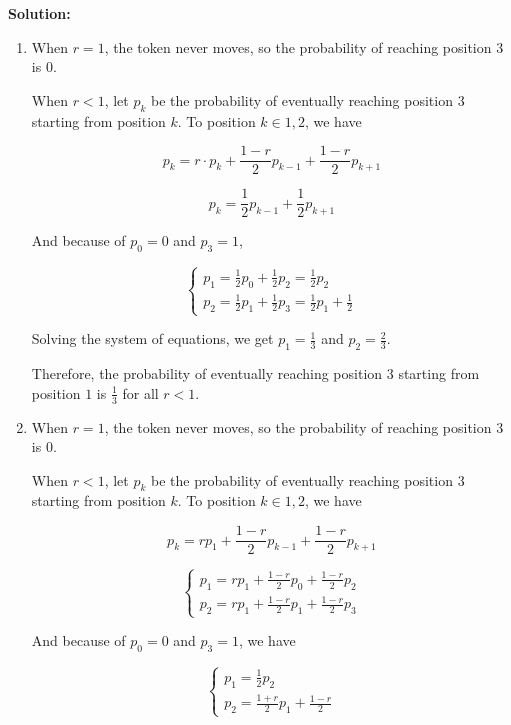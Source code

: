 \documentclass[11pt,a4paper]{article}
\begin{document}
\textbf{Solution:}

\begin{enumerate}
    \item[(a)]

    When $r=1$, the token never moves, so the probability of reaching position $3$ is $0$.

    When $r<1$, let $p_k$ be the probability of eventually reaching position $3$ starting from position $k$. To position $k \in {1, 2}$, we have

    $$
    p_k = r \cdot p_k + \frac{1-r}{2} p_{k-1} + \frac{1-r}{2} p_{k+1}
    $$

    $$
    p_k = \frac{1}{2} p_{k-1} + \frac{1}{2} p_{k+1}
    $$

    And because of $p_0 = 0$ and $p_3 = 1$, 

    $$
    \begin{cases}
    p_1 = \frac{1}{2} p_0 + \frac{1}{2} p_2 = \frac{1}{2} p_2 \\
    p_2 = \frac{1}{2} p_1 + \frac{1}{2} p_3 = \frac{1}{2} p_1 + \frac{1}{2}
    \end{cases}
    $$

    Solving the system of equations, we get $p_1 = \frac{1}{3}$ and $p_2 = \frac{2}{3}$.
    
    Therefore, the probability of eventually reaching position $3$ starting from position $1$ is $\frac{1}{3}$ for all $r<1$.

    \item[(b)]

    When $r=1$, the token never moves, so the probability of reaching position $3$ is $0$.

    When $r<1$, let $p_k$ be the probability of eventually reaching position $3$ starting from position $k$. To position $k \in {1, 2}$, we have
    
    $$
    p_k = r p_1 + \frac{1-r}{2} p_{k-1} + \frac{1-r}{2} p_{k+1}
    $$

    $$
    \begin{cases}
    p_1 = r p_1 + \frac{1-r}{2} p_0 + \frac{1-r}{2} p_2 \\
    p_2 = r p_1 + \frac{1-r}{2} p_1 + \frac{1-r}{2} p_3
    \end{cases}
    $$

    And because of $p_0 = 0$ and $p_3 = 1$, we have

    $$
    \begin{cases}
        p_1 = \frac{1}{2} p_2 \\
        p_2 = \frac{1+r}{2} p_1 + \frac{1-r}{2}
    \end{cases}
    $$


\end{enumerate}
\end{document}
